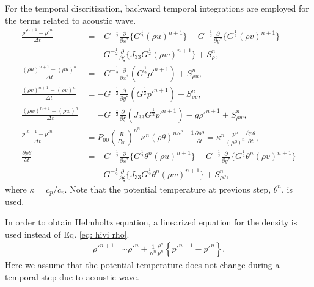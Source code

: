 For the temporal discritization, backward temporal integrations are employed for the terms related to acoustic wave.
\begin{align}
  \frac{\rho'^{n+1}-\rho'^n}{\Delta t} &=
  -G^{-\frac{1}{2}}\frac{\partial}{\partial x^*}\{G^{\frac{1}{2}}(\rho u)^{n+1}\}
  -G^{-\frac{1}{2}}\frac{\partial}{\partial y^*}\{G^{\frac{1}{2}}(\rho v)^{n+1}\} \nonumber\\ & \;\;\;
  -G^{-\frac{1}{2}}\frac{\partial}{\partial \xi}\{J_{33}G^{\frac{1}{2}}(\rho w)^{n+1}\}
  + S_\rho^n, \label{eq: hivi rho} \\
  \frac{(\rho u)^{n+1}-(\rho u)^n}{\Delta t}
  &= -G^{-\frac{1}{2}}\frac{\partial}{\partial x^*}(G^{\frac{1}{2}}p'^{n+1}) + S_{\rho u}^n, \\
  \frac{(\rho v)^{n+1}-(\rho v)^n}{\Delta t}
  &= -G^{-\frac{1}{2}}\frac{\partial}{\partial y^*}(G^{\frac{1}{2}}p'^{n+1}) + S_{\rho v}^n, \\
  \frac{(\rho w)^{n+1}-(\rho w)^n}{\Delta t}
  &= -G^{-\frac{1}{2}}\frac{\partial}{\partial \xi}(J_{33}G^{\frac{1}{2}}p'^{n+1}) -g\rho'^{n+1} + S_{\rho w}^n, \\
  \frac{p'^{n+1} - p'^n}{\Delta t}
  &= P_{00}\left(\frac{R}{P_{00}}\right)^{\kappa^n} \kappa^n {(\rho\theta)^n}^{\kappa^n-1} \frac{\partial \rho\theta}{\partial t}
   = \kappa^n \frac{p^n}{(\rho\theta)^n}\frac{\partial \rho\theta}{\partial t}, \\
  \frac{\partial \rho\theta}{\partial t} &=
  -G^{-\frac{1}{2}}\frac{\partial}{\partial x^*}\{G^{\frac{1}{2}}\theta^n (\rho u)^{n+1}\}
  -G^{-\frac{1}{2}}\frac{\partial}{\partial y^*}\{G^{\frac{1}{2}}\theta^n (\rho v)^{n+1}\}  \nonumber\\ & \;\;\;
  -G^{-\frac{1}{2}}\frac{\partial}{\partial \xi}\{J_{33}G^{\frac{1}{2}}\theta^n (\rho w)^{n+1}\}
  + S_{\rho\theta}^n,
\end{align}
where $\kappa = c_p/c_v$.
Note that the potential temperature at previous step, $\theta^n$, is used.

In order to obtain Helmholtz equation, a linearized equation for the density is used instead of Eq. \ref{eq: hivi rho}.
\begin{align}
  \rho'^{n+1} &\sim
  \rho'^n + \frac{1}{\kappa^n} \frac{\rho^n}{p^n} \left\{p'^{n+1}-p'^n\right\}.
\end{align}
Here we assume that the potential temperature does not change during a temporal step due to acoustic wave.

